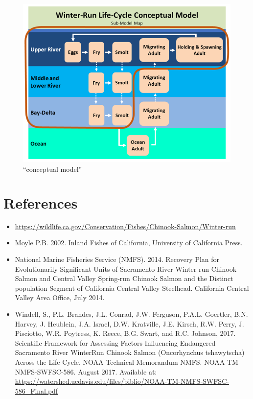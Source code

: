 \documentclass[
]{book}
\providecommand{\tightlist}{%
  \setlength{\itemsep}{0pt}\setlength{\parskip}{0pt}}
\theoremstyle{definition}
\theoremstyle{definition}
\theoremstyle{definition}
\theoremstyle{definition}
\theoremstyle{remark}
\begin{document}
\begin{figure}
\centering
\includegraphics{figures/WRCM.png}
\caption{``conceptual model''}
\end{figure}

\hypertarget{references}{%
\section{References}\label{references}}

\begin{itemize}
\tightlist
\item
  \url{https://wildlife.ca.gov/Conservation/Fishes/Chinook-Salmon/Winter-run}
\item
  Moyle P.B. 2002. Inland Fishes of California, University of California Press.
\item
  National Marine Fisheries Service (NMFS). 2014. Recovery Plan for Evolutionarily Significant Units of Sacramento River Winter-run Chinook Salmon and Central Valley Spring-run Chinook Salmon and the Distinct population Segment of California Central Valley Steelhead. California Central Valley Area Office, July 2014.
\item
  Windell, S., P.L. Brandes, J.L. Conrad, J.W. Ferguson, P.A.L. Goertler, B.N. Harvey, J. Heublein, J.A. Israel, D.W. Kratville, J.E. Kirsch, R.W. Perry, J. Pisciotto, W.R. Poytress, K. Reece, B.G. Swart, and R.C. Johnson, 2017. Scientific Framework for Assessing Factors Influencing Endangered Sacramento River Winter­Run Chinook Salmon (Oncorhynchus tshawytscha) Across the Life Cycle. NOAA Technical Memorandum NMFS. NOAA-TM-NMFS-SWFSC-586. August 2017. Available at: \url{https://watershed.ucdavis.edu/files/biblio/NOAA-TM-NMFS-SWFSC-586_Final.pdf}
\end{itemize}
\end{document}
